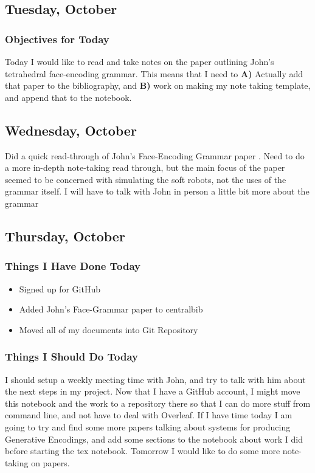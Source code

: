 \documentclass[letterpaper,oneside,titlepage]{article}
\begin{document}
\subsection{Tuesday, October }
\subsubsection{Objectives for Today}
Today I would like to read and take notes on the paper outlining John's tetrahedral face-encoding grammar.  This means that I need to \textbf{A)} Actually add that paper to the bibliography, and \textbf{B)} work on making my note taking template, and append that to the notebook.

\subsection{Wednesday, October }
Did a quick read-through of John's Face-Encoding Grammar paper \cite{Rieffel:face-grammar}.  Need to do a more in-depth note-taking read through, but the main focus of the paper seemed to be concerned with simulating the soft robots, not the uses of the grammar itself.  I will have to talk with John in person a little bit more about the grammar

\subsection{Thursday, October }
\subsubsection{Things I Have Done Today}
\begin{itemize}
\item Signed up for GitHub
\item Added John's Face-Grammar paper to centralbib
\item Moved all of my documents into Git Repository
\end{itemize}
\subsubsection{Things I Should Do Today}
I should setup a weekly meeting time with John, and try to talk with him about the next steps in my project.  Now that I have a GitHub account, I might move this notebook and the work to a repository there so that I can do more stuff from command line, and not have to deal with Overleaf.  If I have time today I am going to try and find some more papers talking about systems for producing Generative Encodings, and add some sections to the notebook about work I did before starting the tex notebook.  Tomorrow I would like to do some more note-taking on papers.
\end{document}
